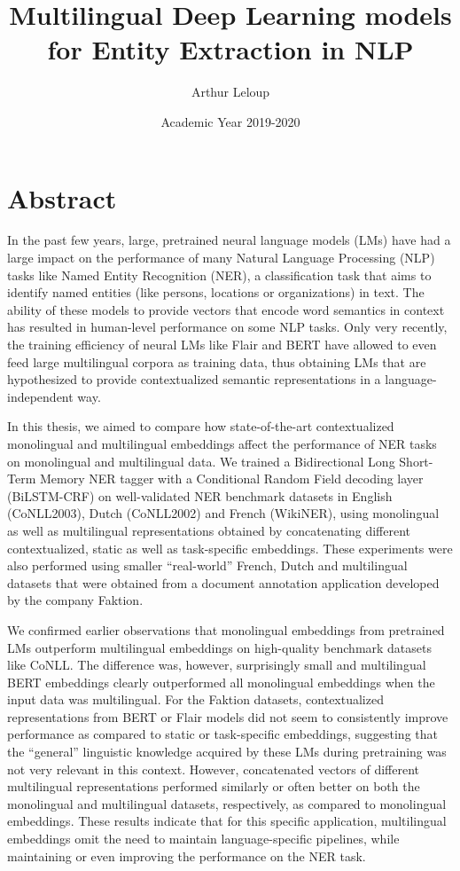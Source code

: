 \documentclass[12pt,a4paper,]{book}
\title{Multilingual Deep Learning models for Entity Extraction in NLP}
\author{Arthur Leloup}
\date{Academic Year 2019-2020}
\begin{document}
\maketitle

{
\setcounter{tocdepth}{1}
\tableofcontents
}
\frontmatter

\hypertarget{abstract}{%
\chapter*{Abstract}\label{abstract}}

In the past few years, large, pretrained neural language models (LMs) have had a large impact on the performance of many Natural Language Processing (NLP) tasks like Named Entity Recognition (NER), a classification task that aims to identify named entities (like persons, locations or organizations) in text. The ability of these models to provide vectors that encode word semantics in context has resulted in human-level performance on some NLP tasks. Only very recently, the training efficiency of neural LMs like Flair and BERT have allowed to even feed large multilingual corpora as training data, thus obtaining LMs that are hypothesized to provide contextualized semantic representations in a language-independent way.

In this thesis, we aimed to compare how state-of-the-art contextualized monolingual and multilingual embeddings affect the performance of NER tasks on monolingual and multilingual data. We trained a Bidirectional Long Short-Term Memory NER tagger with a Conditional Random Field decoding layer (BiLSTM-CRF) on well-validated NER benchmark datasets in English (CoNLL2003), Dutch (CoNLL2002) and French (WikiNER), using monolingual as well as multilingual representations obtained by concatenating different contextualized, static as well as task-specific embeddings. These experiments were also performed using smaller ``real-world'' French, Dutch and multilingual datasets that were obtained from a document annotation application developed by the company Faktion.

We confirmed earlier observations that monolingual embeddings from pretrained LMs outperform multilingual embeddings on high-quality benchmark datasets like CoNLL. The difference was, however, surprisingly small and multilingual BERT embeddings clearly outperformed all monolingual embeddings when the input data was multilingual. For the Faktion datasets, contextualized representations from BERT or Flair models did not seem to consistently improve performance as compared to static or task-specific embeddings, suggesting that the ``general'' linguistic knowledge acquired by these LMs during pretraining was not very relevant in this context. However, concatenated vectors of different multilingual representations performed similarly or often better on both the monolingual and multilingual datasets, respectively, as compared to monolingual embeddings. These results indicate that for this specific application, multilingual embeddings omit the need to maintain language-specific pipelines, while maintaining or even improving the performance on the NER task.
\end{document}
